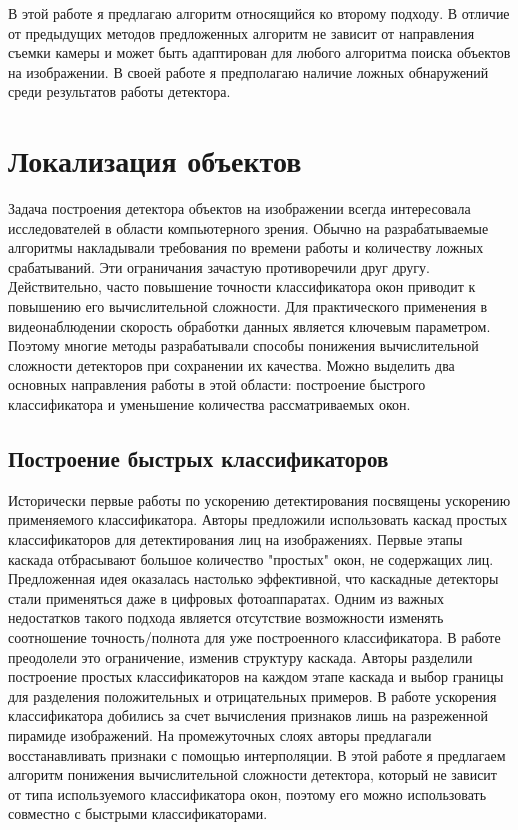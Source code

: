 В этой работе я предлагаю алгоритм относящийся ко второму подходу. В отличие от предыдущих методов предложенных алгоритм не зависит от направления съемки камеры и может быть адаптирован для любого алгоритма поиска объектов на изображении. В своей работе я предполагаю наличие ложных обнаружений среди результатов работы детектора.

\section{Локализация объектов}

Задача построения детектора объектов на изображении всегда интересовала исследователей в области компьютерного зрения. Обычно на разрабатываемые алгоритмы накладывали требования по времени работы и количеству ложных срабатываний. Эти ограничания зачастую противоречили друг другу. Действительно, часто повышение точности классификатора окон приводит к повышению его вычислительной сложности. Для практического применения в видеонаблюдении скорость обработки данных является ключевым параметром. Поэтому многие методы разрабатывали способы понижения вычислительной сложности детекторов при сохранении их качества. Можно выделить два основных направления работы в этой области: построение быстрого классификатора и уменьшение количества рассматриваемых окон.

\subsection{Построение быстрых классификаторов}

Исторически первые работы по ускорению детектирования посвящены ускорению применяемого классификатора. Авторы \cite{viola2001rapid} предложили использовать каскад простых классификаторов для детектирования лиц на изображениях. Первые этапы каскада отбрасывают большое количество "простых" окон, не содержащих лиц. Предложенная идея оказалась настолько эффективной, что каскадные детекторы стали применяться даже в цифровых фотоаппаратах. Одним из важных недостатков такого подхода является отсутствие возможности изменять соотношение точность/полнота для уже построенного классификатора. В работе \cite{bourdev2005robust} преодолели это ограничение, изменив структуру каскада. Авторы разделили построение простых классификаторов на каждом этапе каскада и выбор границы для разделения положительных и отрицательных примеров. В работе \cite{dollar2010fastest} ускорения классификатора добились за счет вычисления признаков лишь на разреженной пирамиде изображений. На промежуточных слоях авторы предлагали восстанавливать признаки с помощью интерполяции. В этой работе я предлагаем алгоритм понижения вычислительной сложности детектора, который не зависит от типа используемого классификатора окон, поэтому его можно использовать совместно с быстрыми классификаторами.


